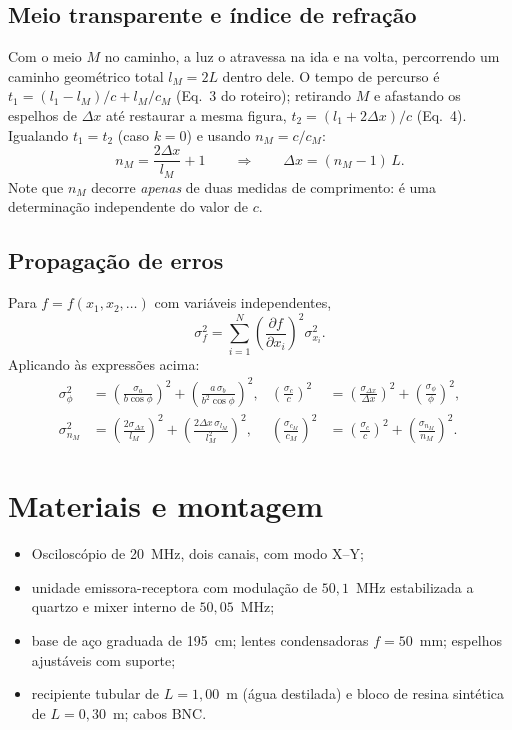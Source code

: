 \documentclass[11pt,a4paper]{article}
\begin{document}
\subsection{Meio transparente e índice de refração}
Com o meio $M$ no caminho, a luz o atravessa na ida e na volta, percorrendo um
caminho geométrico total $l_M = 2L$ dentro dele. O tempo de percurso é
$t_1 = (l_1 - l_M)/c + l_M/c_M$ (Eq.~3 do roteiro); retirando $M$ e afastando
os espelhos de $\Delta x$ até restaurar a mesma figura,
$t_2 = (l_1 + 2\Delta x)/c$ (Eq.~4). Igualando $t_1 = t_2$ (caso $k=0$) e
usando $n_M = c/c_M$:
\begin{equation}
n_M = \frac{2\Delta x}{l_M} + 1 \qquad\Longrightarrow\qquad
\Delta x = (n_M - 1)\,L .
\label{eq:nm}
\end{equation}
Note que $n_M$ decorre \emph{apenas} de duas medidas de comprimento: é uma
determinação independente do valor de $c$.

\subsection{Propagação de erros}
Para $f = f(x_1,x_2,\dots)$ com variáveis independentes,
\begin{equation}
\sigma_f^2 = \sum_{i=1}^{N}\left(\frac{\partial f}{\partial x_i}\right)^{2}\sigma_{x_i}^2 .
\label{eq:prop}
\end{equation}
Aplicando às expressões acima:
\begin{align}
\sigma_\phi^2 &= \left(\frac{\sigma_a}{b\cos\phi}\right)^{2}
              + \left(\frac{a\,\sigma_b}{b^{2}\cos\phi}\right)^{2}, &
\left(\frac{\sigma_c}{c}\right)^{2} &=
              \left(\frac{\sigma_{\Delta x}}{\Delta x}\right)^{2}
            + \left(\frac{\sigma_\phi}{\phi}\right)^{2}, \\
\sigma_{n_M}^2 &= \left(\frac{2\sigma_{\Delta x}}{l_M}\right)^{2}
              + \left(\frac{2\Delta x\,\sigma_{l_M}}{l_M^{2}}\right)^{2}, &
\left(\frac{\sigma_{c_M}}{c_M}\right)^{2} &=
              \left(\frac{\sigma_c}{c}\right)^{2}
            + \left(\frac{\sigma_{n_M}}{n_M}\right)^{2}.
\end{align}

\section{Materiais e montagem}
\begin{itemize}\setlength\itemsep{1pt}
\item Osciloscópio de 20~MHz, dois canais, com modo X--Y;
\item unidade emissora-receptora com modulação de $50{,}1$~MHz estabilizada a
      quartzo e mixer interno de $50{,}05$~MHz;
\item base de aço graduada de 195~cm; lentes condensadoras $f = 50$~mm;
      espelhos ajustáveis com suporte;
\item recipiente tubular de $L = 1{,}00$~m (água destilada) e bloco de resina
      sintética de $L = 0{,}30$~m; cabos BNC.
\end{itemize}
\end{document}
